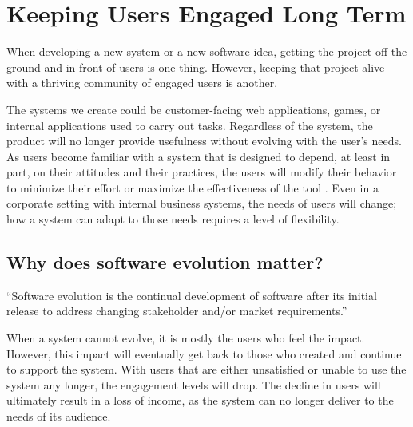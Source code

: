 
\section{Keeping Users Engaged Long Term} \label{sectionTheProblem}


When developing a new system or a new software idea, getting the project off the ground and in front of users is one thing. However, keeping that project alive with a thriving community of engaged users is another.

The systems we create could be customer-facing web applications, games, or internal applications used to carry out tasks. Regardless of the system, the product will no longer provide usefulness without evolving with the user's needs. As users become familiar with a system that is designed to depend, at least in part, on their attitudes and their practices, the users will modify their behavior to minimize their effort or maximize the effectiveness of the tool \cite{lehman:1980}. Even in a corporate setting with internal business systems, the needs of users will change; how a system can adapt to those needs requires a level of flexibility.

\subsection{Why does software evolution matter?} \label{subWhySoftwareEvolution}

\vspace{0.25cm}
\begin{displayquote}
  ``Software evolution is the continual development of software after its initial release to address changing stakeholder and/or market requirements.'' \cite{wiki:software-evolution}
\end{displayquote}
\vspace{0.25cm}

When a system cannot evolve, it is mostly the users who feel the impact. However, this impact will eventually get back to those who created and continue to support the system. With users that are either unsatisfied or unable to use the system any longer, the engagement levels will drop. The decline in users will ultimately result in a loss of income, as the system can no longer deliver to the needs of its audience.

